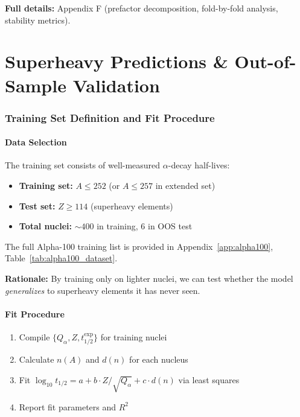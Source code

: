 \documentclass[11pt,a4paper]{article}
\begin{document}
\textbf{Full details:} Appendix F (prefactor decomposition, fold-by-fold analysis, stability metrics).

\newpage


\part{Superheavy Predictions \& Out-of-Sample Validation}

\section{Training Set Definition and Fit Procedure}
\label{sec:training}

\subsection{Data Selection}

The training set consists of well-measured $\alpha$-decay half-lives:

\begin{itemize}
    \item \textbf{Training set:} $A \leq 252$ (or $A \leq 257$ in extended set)
    \item \textbf{Test set:} $Z \geq 114$ (superheavy elements)
    \item \textbf{Total nuclei:} $\sim 400$ in training, 6 in OOS test
\end{itemize}

The full Alpha-100 training list is provided in Appendix~\ref{app:alpha100}, Table~\ref{tab:alpha100_dataset}.

\textbf{Rationale:} By training only on lighter nuclei, we can test whether the model \emph{generalizes} to superheavy elements it has never seen.

\subsection{Fit Procedure}

\begin{enumerate}
    \item Compile $\{Q_\alpha, Z, t_{1/2}^{\text{exp}}\}$ for training nuclei
    \item Calculate $n(A)$ and $d(n)$ for each nucleus
    \item Fit $\log_{10} t_{1/2} = a + b \cdot Z/\sqrt{Q_\alpha} + c \cdot d(n)$ via least squares
    \item Report fit parameters and $R^2$
\end{enumerate}
\end{document}
